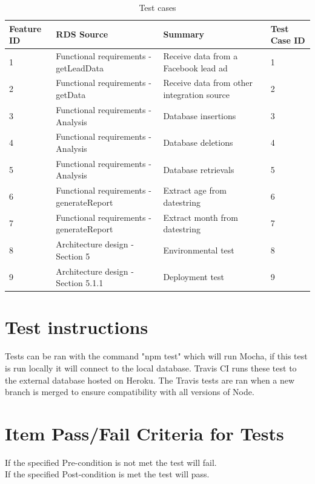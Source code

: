 \documentclass{article}
\begin{document}
\begin{table}[]
\centering
\caption{Test cases}
\label{test_table}
\begin{tabular}{|l|l|l|l|}
\hline
Feature ID & RDS Source                            & Summary                                    & Test Case ID \\ \hline \hline
1          & Functional requirements - getLeadData & Receive data from a Facebook lead ad       & 1            \\ \hline
2          & Functional requirements - getData     & Receive data from other integration source & 2            \\ \hline
3          & Functional requirements - Analysis    & Database insertions                        & 3            \\ \hline
4          & Functional requirements - Analysis    & Database deletions                         & 4            \\ \hline
5          & Functional requirements - Analysis    & Database retrievals                        & 5            \\ \hline
6          & Functional requirements - generateReport & Extract age from datestring			    & 6			   \\ \hline
7	       & Functional requirements - generateReport & Extract month from datestring			& 7            \\ \hline
8          &  Architecture design - Section 5      & Environmental test                         & 8            \\ \hline
9          &  Architecture design - Section 5.1.1  & Deployment test                            & 9            \\ \hline
\end{tabular}
\end{table}


\section{Test instructions} 
Tests can be ran with the command "npm test" which will run Mocha, if this test is run locally it will connect to the local database.
Travis CI runs these test to the external database hosted on Heroku. The Travis tests are ran when a new branch is merged to ensure compatibility with all versions of Node.
\section{Item Pass/Fail Criteria for Tests}
If the specified Pre-condition is not met the test will fail. \\
If the specified Post-condition is met the test will pass.
\cleardoublepage
\end{document}
